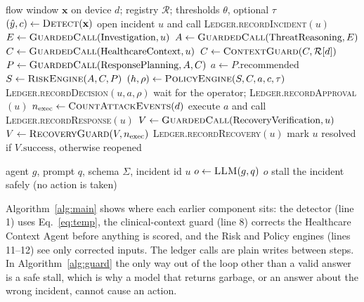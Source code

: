 \documentclass[preprint,12pt]{elsarticle}
\begin{document}
\begin{algorithm}[htbp]
\caption{Incident handling in the proposed framework}
\label{alg:main}
\begin{algorithmic}[1]
\Require flow window $\mathbf{x}$ on device $d$; registry $\mathcal{R}$; thresholds $\theta$, optional $\tau$
\State $(\hat y, c)\gets \textsc{Detect}(\mathbf{x})$ 
  \State \Return
\EndIf
\State open incident $u$ and call \textsc{Ledger.recordIncident}$(u)$
\State $E\gets \textsc{GuardedCall}(\text{Investigation}, u)$
\State $A\gets \textsc{GuardedCall}(\text{ThreatReasoning}, E)$
\State $C\gets \textsc{GuardedCall}(\text{HealthcareContext}, u)$
\State $C\gets \textsc{ContextGuard}(C,\mathcal{R}[d])$ 
\State $P\gets \textsc{GuardedCall}(\text{ResponsePlanning}, A, C)$
\State $a\gets P.\text{recommended}$
\State $S\gets \textsc{RiskEngine}(A, C, P)$ 
\State $(h, \rho)\gets \textsc{PolicyEngine}(S, C, a, c, \tau)$ 
\State \textsc{Ledger.recordDecision}$(u, a, \rho)$
  \State wait for the operator; \textsc{Ledger.recordApproval}$(u)$
   \State \Return \EndIf
\EndIf
\State $n_{\mathrm{exec}}\gets \textsc{CountAttackEvents}(d)$
\State execute $a$ and call \textsc{Ledger.recordResponse}$(u)$
\State $V\gets \textsc{GuardedCall}(\text{RecoveryVerification}, u)$
\State $V\gets \textsc{RecoveryGuard}(V, n_{\mathrm{exec}})$ 
\State \textsc{Ledger.recordRecovery}$(u)$
\State mark $u$ resolved if $V.\text{success}$, otherwise reopened
\end{algorithmic}
\end{algorithm}

\begin{algorithm}[htbp]
\caption{\textsc{GuardedCall}: schema validation, retry and identity check}
\label{alg:guard}
\begin{algorithmic}[1]
\Require agent $g$, prompt $q$, schema $\Sigma$, incident id $u$
  \State $o\gets \textsc{LLM}(g,q)$
   
    \State \Return $o$
  \EndIf
\EndFor
\State stall the incident safely (no action is taken)
\end{algorithmic}
\end{algorithm}

Algorithm~\ref{alg:main} shows where each earlier component sits: the detector (line 1) uses Eq.~\eqref{eq:temp}, the clinical-context guard (line 8) corrects the Healthcare Context Agent before anything is scored, and the Risk and Policy engines (lines 11--12) see only corrected inputs. The ledger calls are plain writes between steps. In Algorithm~\ref{alg:guard} the only way out of the loop other than a valid answer is a safe stall, which is why a model that returns garbage, or an answer about the wrong incident, cannot cause an action.
\end{document}
